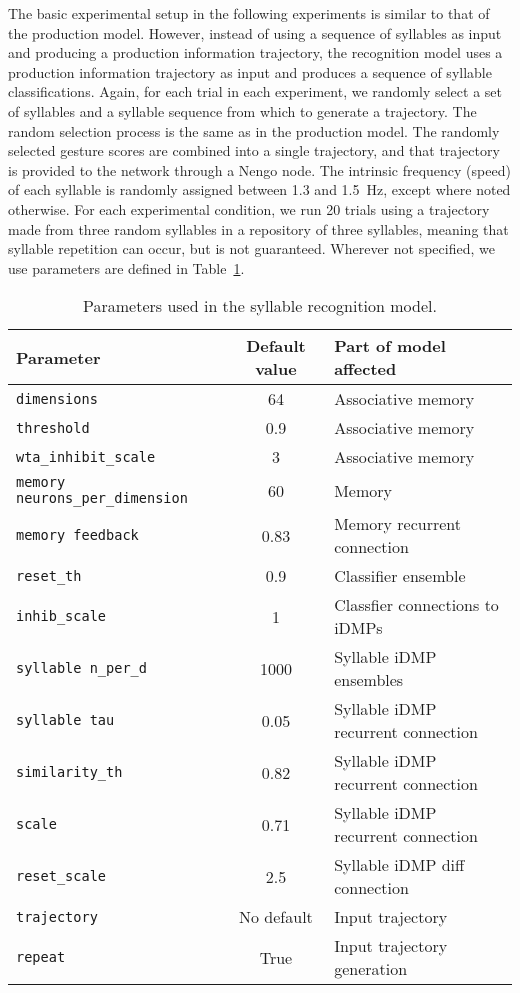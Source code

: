 The basic experimental setup
in the following experiments
is similar to that of the production model.
However, instead of using
a sequence of syllables
as input and producing
a production information trajectory,
the recognition model
uses a production information trajectory
as input and produces
a sequence of syllable classifications.
Again, for each trial in each experiment,
we randomly select a set of syllables
and a syllable sequence
from which to generate a trajectory.
The random selection process
is the same as in the production model.
The randomly selected
gesture scores are combined
into a single trajectory,
and that trajectory
is provided to the network
through a Nengo node.
The intrinsic frequency (speed)
of each syllable is randomly assigned
between 1.3 and 1.5~Hz,
except where noted otherwise.
For each experimental condition,
we run 20 trials using
a trajectory made from
three random syllables
in a repository of three syllables,
meaning that syllable repetition can occur,
but is not guaranteed.
Wherever not specified,
we use parameters are defined in
Table~\ref{tab:recog}.

\begin{table}[ht!]
  \begin{footnotesize}
    \begin{center}
      \begin{tabular}{lcl}
        \toprule
        Parameter & Default value & Part of model affected \\
        \midrule
        \texttt{dimensions} & 64 & Associative memory \\
        \texttt{threshold} & 0.9 & Associative memory \\
        \texttt{wta\_inhibit\_scale} & 3 & Associative memory \\
        \texttt{memory neurons\_per\_dimension} & 60 & Memory \\
        \texttt{memory feedback} & 0.83 & Memory recurrent connection \\
        \texttt{reset\_th} & 0.9 & Classifier ensemble \\
        \texttt{inhib\_scale} & 1 & Classfier connections to iDMPs \\
        \texttt{syllable n\_per\_d} & 1000 & Syllable iDMP ensembles \\
        \texttt{syllable tau} & 0.05 & Syllable iDMP recurrent connection \\
        \texttt{similarity\_th} & 0.82 & Syllable iDMP recurrent connection \\
        \texttt{scale} & 0.71 & Syllable iDMP recurrent connection \\
        \texttt{reset\_scale} & 2.5 & Syllable iDMP diff connection \\
        \texttt{trajectory} & No default & Input trajectory \\
        \texttt{repeat} & True & Input trajectory generation \\
        \bottomrule
      \end{tabular}
    \end{center}
  \end{footnotesize}
  \caption{Parameters used in the syllable recognition model.}
\label{tab:recog}
\end{table}

